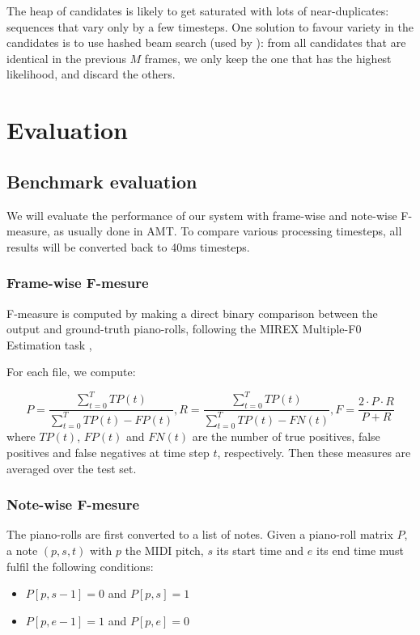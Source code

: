 \documentclass{article}
\begin{document}
The heap of candidates is likely to get saturated with lots of near-duplicates: sequences that vary only by a few timesteps.
One solution to favour variety in the candidates is to use hashed beam search (used by \citep{Korzeniowski2018}):
from all candidates that are identical in the previous $M$ frames, we only keep the one that has the highest likelihood, and discard the others.


\section{Evaluation}

\subsection{Benchmark evaluation}

We will evaluate the performance of our system with frame-wise and note-wise F-measure, as usually done in AMT.
To compare various processing timesteps, all results will be converted back to 40ms timesteps.

\subsubsection{Frame-wise F-mesure}

F-measure is computed by making a direct binary comparison between the output and ground-truth piano-rolls, following the MIREX Multiple-F0 Estimation task \citep{Bay2009}, 

For each file, we compute:

\[
P = \frac{\sum_{t=0}^{T}TP(t)}{\sum_{t=0}^{T}TP(t) - FP(t)} ,
R = \frac{\sum_{t=0}^{T}TP(t)}{\sum_{t=0}^{T}TP(t) - FN(t)} ,
F = \frac{2 \cdot P \cdot R}{P + R} 
\]
where $TP(t)$, $FP(t)$ and $FN(t)$ are the number of true positives, false positives and false negatives at time step $t$, respectively. 
Then these measures are averaged over the test set.

\subsubsection{Note-wise F-mesure}

The piano-rolls are first converted to a list of notes.
Given a piano-roll matrix $P$, a note $(p,s,t)$ with $p$ the MIDI pitch, $s$ its start time and $e$ its end time must fulfil the following conditions:

\begin{itemize}
\item $P[p,s-1] = 0$ and $P[p,s] = 1$
\item $P[p,e-1] = 1$ and $P[p,e] = 0$
\end{itemize}
\end{document}
